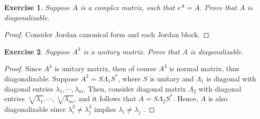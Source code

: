 \documentclass[11pt]{book}
\newtheorem{exercise}{Exercise}[section]
\theoremstyle{definition}
\numberwithin{equation}{subsection}
\begin{document}
\medskip

\begin{exercise}
Suppose $A$ is a complex matrix, such that $e^A = A$. Prove that $A$ is diagonalizable.
\end{exercise}
\begin{proof}
Consider Jordan canonical form and each Jordan block.
\end{proof}

\medskip

\begin{exercise}{\bf *}
Suppose $A^3$ is a unitary matrix. Prove that $A$ is diagonalizable.
\end{exercise}
\begin{proof}
Since $A^3$ is unitary matrix, then of course $A^3$ is normal matrix, thus diagonalizable. Suppose $A^3 = S \Lambda_1 S^*$, where $S$ is unitary and $\Lambda_1$ is diagonal with diagonal entries $\lambda_1, \cdots, \lambda_m$. Then, consider diagonal matrix $\Lambda_2$ with diagonal entries $\sqrt[3]{\lambda_1}, \cdots, \sqrt[3]{\lambda_m}$, and it follows that $A = S \Lambda_2 S^*$. Hence, $A$ is also diagonalizable since $\lambda_i^3 \neq \lambda_j^3$ implies $\lambda_i \neq \lambda_j$ \cite{22}.
\end{proof}

\medskip
\end{document}
